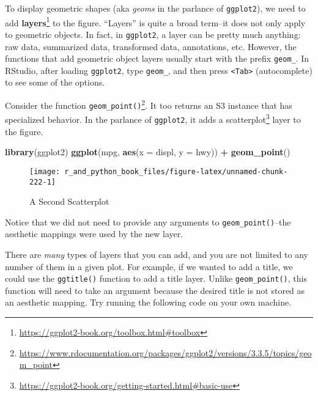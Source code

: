 \documentclass[12pt,krantz2]{krantz}
\makeatletter
\newenvironment{Shaded}{\begin{snugshade}}{\end{snugshade}}
\newcommand{\DataTypeTok}[1]{\textcolor[rgb]{0.27,0.27,0.27}{#1}}
\newcommand{\KeywordTok}[1]{\textcolor[rgb]{0.27,0.27,0.27}{\textbf{#1}}}
\newcommand{\NormalTok}[1]{#1}
\newcommand{\OperatorTok}[1]{\textcolor[rgb]{0.43,0.43,0.43}{\textbf{#1}}}
\newcommand{\StringTok}[1]{\textcolor[rgb]{0.5,0.5,0.5}{#1}}
\renewcommand{\href}[2]{#2\footnote{\url{#1}}}
\newenvironment{kframe}{%
\medskip{}
\setlength{\fboxsep}{.8em}
 \def\at@end@of@kframe{}%
 \ifinner\ifhmode%
  \def\at@end@of@kframe{\end{minipage}}%
  \begin{minipage}{\columnwidth}%
 \fi\fi%
 \def\FrameCommand##1{\hskip\@totalleftmargin \hskip-\fboxsep
 \colorbox{shadecolor}{##1}\hskip-\fboxsep
     \hskip-\linewidth \hskip-\@totalleftmargin \hskip\columnwidth}%
 \MakeFramed {\advance\hsize-\width
   \@totalleftmargin\z@ \linewidth\hsize
   \@setminipage}}%
 {\par\unskip\endMakeFramed%
 \at@end@of@kframe}
\renewenvironment{Shaded}{\begin{kframe}}{\end{kframe}}
\makeatother
\begin{document}
To display geometric shapes (aka \emph{geoms} in the parlance of \texttt{ggplot2}), we need to add \href{https://ggplot2-book.org/toolbox.html\#toolbox}{\textbf{layers}} to the figure. ``Layers'' is quite a broad term--it does not only apply to geometric objects. In fact, in \texttt{ggplot2}, a layer can be pretty much anything: raw data, summarized data, transformed data, annotations, etc. However, the functions that add geometric object layers usually start with the prefix \texttt{geom\_}. In RStudio, after loading \texttt{ggplot2}, type \texttt{geom\_}, and then press \texttt{\textless{}Tab\textgreater{}} (autocomplete) to see some of the options.

Consider the function \href{https://www.rdocumentation.org/packages/ggplot2/versions/3.3.5/topics/geom_point}{\texttt{geom\_point()}}. It too returns an S3 instance that has specialized behavior. In the parlance of \texttt{ggplot2}, it adds a \href{https://ggplot2-book.org/getting-started.html\#basic-use}{scatterplot} layer to the figure.

\begin{Shaded}
\begin{Highlighting}[]
\KeywordTok{library}\NormalTok{(ggplot2)}
\KeywordTok{ggplot}\NormalTok{(mpg, }\KeywordTok{aes}\NormalTok{(}\DataTypeTok{x =}\NormalTok{ displ, }\DataTypeTok{y =}\NormalTok{ hwy))  }\OperatorTok{+}
\StringTok{  }\KeywordTok{geom_point}\NormalTok{()}
\end{Highlighting}
\end{Shaded}

\begin{figure}

{\centering \texttt{[image: r\_and\_python\_book\_files/figure-latex/unnamed-chunk-222-1]} 

}

\caption{A Second Scatterplot}\label{fig:unnamed-chunk-222}
\end{figure}

Notice that we did not need to provide any arguments to \texttt{geom\_point()}--the aesthetic mappings were used by the new layer.

There are \emph{many} types of layers that you can add, and you are not limited to any number of them in a given plot. For example, if we wanted to add a title, we could use the \texttt{ggtitle()} function to add a title layer. Unlike \texttt{geom\_point()}, this function will need to take an argument because the desired title is not stored as an aesthetic mapping. Try running the following code on your own machine.
\end{document}
